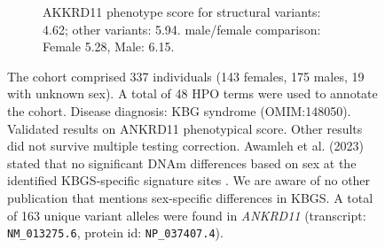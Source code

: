 
\begin{figure}[htbp]\ContinuedFloat
\begin{subfigure}[b]{0.95\textwidth}
\captionsetup{justification=raggedright,singlelinecheck=false}
\caption{AKKRD11 phenotype score for structural variants: 4.62; other variants: 5.94. male/female comparison: Female 5.28, Male: 6.15.}
\end{subfigure}

\vspace{2em}

\caption{The cohort comprised 337 individuals (143 females, 175 males, 19 with unknown sex). A total of 48 HPO terms were used to annotate the cohort. Disease diagnosis: KBG syndrome (OMIM:148050). Validated results on ANKRD11 phenotypical score. Other results did not survive multiple testing correction. Awamleh et al. (2023) stated that no significant DNAm differences based on sex at the identified KBGS-specific signature sites \cite{PMID_36440975}. We are aware of no other publication that mentions sex-specific differences in KBGS. A total of 163 unique variant alleles were found in \textit{ANKRD11} (transcript: \texttt{NM\_013275.6}, protein id: \texttt{NP\_037407.4}).}
\end{figure}

